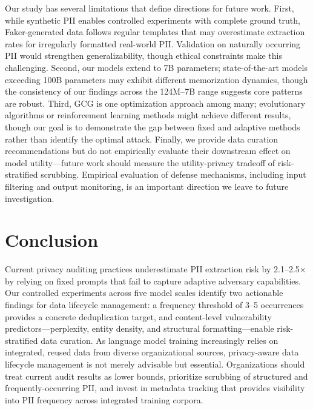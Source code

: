 \documentclass[conference]{IEEEtran}
\begin{document}
Our study has several limitations that define directions for future work. First, while synthetic PII enables controlled experiments with complete ground truth, Faker-generated data follows regular templates that may overestimate extraction rates for irregularly formatted real-world PII. Validation on naturally occurring PII would strengthen generalizability, though ethical constraints make this challenging. Second, our models extend to 7B parameters; state-of-the-art models exceeding 100B parameters may exhibit different memorization dynamics, though the consistency of our findings across the 124M--7B range suggests core patterns are robust. Third, GCG is one optimization approach among many; evolutionary algorithms or reinforcement learning methods might achieve different results, though our goal is to demonstrate the gap between fixed and adaptive methods rather than identify the optimal attack. Finally, we provide data curation recommendations but do not empirically evaluate their downstream effect on model utility---future work should measure the utility-privacy tradeoff of risk-stratified scrubbing. Empirical evaluation of defense mechanisms, including input filtering and output monitoring, is an important direction we leave to future investigation.

\section{Conclusion}
\label{sec:conclusion}

Current privacy auditing practices underestimate PII extraction risk by 2.1--2.5$\times$ by relying on fixed prompts that fail to capture adaptive adversary capabilities. Our controlled experiments across five model scales identify two actionable findings for data lifecycle management: a frequency threshold of 3--5 occurrences provides a concrete deduplication target, and content-level vulnerability predictors---perplexity, entity density, and structural formatting---enable risk-stratified data curation. As language model training increasingly relies on integrated, reused data from diverse organizational sources, privacy-aware data lifecycle management is not merely advisable but essential. Organizations should treat current audit results as lower bounds, prioritize scrubbing of structured and frequently-occurring PII, and invest in metadata tracking that provides visibility into PII frequency across integrated training corpora.
\end{document}

